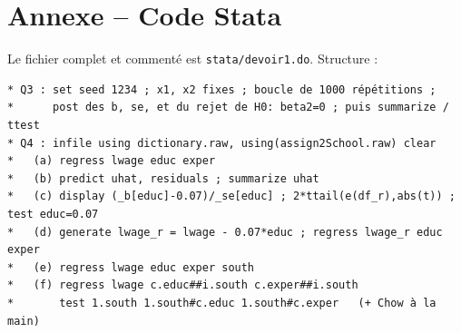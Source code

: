 \documentclass[11pt,a4paper]{article}
\begin{document}
\section*{Annexe -- Code Stata}
Le fichier complet et commenté est \texttt{stata/devoir1.do}. Structure :
\begin{lstlisting}
* Q3 : set seed 1234 ; x1, x2 fixes ; boucle de 1000 répétitions ;
*      post des b, se, et du rejet de H0: beta2=0 ; puis summarize / ttest
* Q4 : infile using dictionary.raw, using(assign2School.raw) clear
*   (a) regress lwage educ exper
*   (b) predict uhat, residuals ; summarize uhat
*   (c) display (_b[educ]-0.07)/_se[educ] ; 2*ttail(e(df_r),abs(t)) ; test educ=0.07
*   (d) generate lwage_r = lwage - 0.07*educ ; regress lwage_r educ exper
*   (e) regress lwage educ exper south
*   (f) regress lwage c.educ##i.south c.exper##i.south
*       test 1.south 1.south#c.educ 1.south#c.exper   (+ Chow à la main)
\end{lstlisting}
\end{document}
